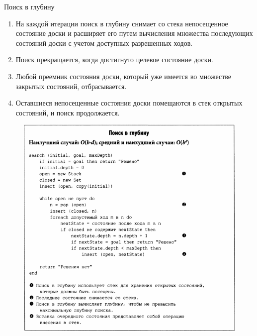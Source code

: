 \documentclass{beamer}
\begin{document}
\begin{frame}{Поиск в глубину}
\begin{enumerate}
\item На каждой итерации поиск в глубину снимает со стека непосещенное состояние доски и расширяет его путем вычисления множества последующих состояний доски с учетом доступных разрешенных ходов. 
\item Поиск прекращается, когда достигнуто целевое состояние доски. 
\item Любой преемник состояния доски, который уже имеется во множестве закрытых состояний, отбрасывается. 
\item Оставшиеся непосещенные состояния доски помещаются в стек открытых состояний, и поиск продолжается.
\end{enumerate}
\end{frame}

\begin{frame}
\begin{figure}[h]
\centering
\includegraphics[scale=0.5]{images/lec06-pic02.png}
\end{figure}
\end{frame}
\end{document}
